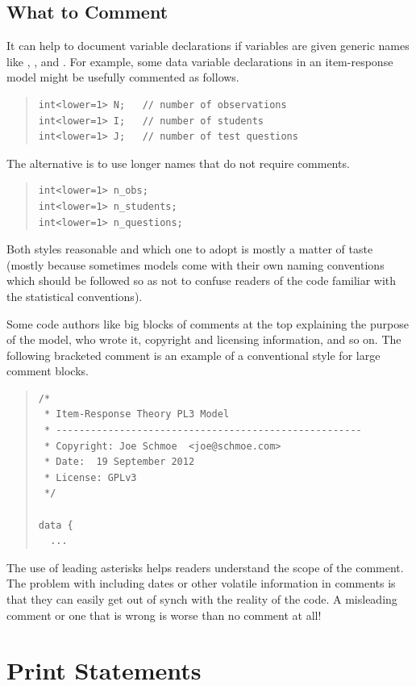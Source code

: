 \subsection{What to Comment}

It can help to document variable declarations if variables are given
generic names like , , and .  For
example, some data variable declarations in an item-response model
might be usefully commented as follows.
%
\begin{quote}
\begin{Verbatim}
int<lower=1> N;   // number of observations
int<lower=1> I;   // number of students
int<lower=1> J;   // number of test questions
\end{Verbatim}
\end{quote}
%
The alternative is to use longer names that do not require comments.
%
\begin{quote}
\begin{Verbatim}
int<lower=1> n_obs;
int<lower=1> n_students;
int<lower=1> n_questions;
\end{Verbatim}
\end{quote}
%
Both styles reasonable and which one to adopt is mostly a matter of
taste (mostly because sometimes models come with their own naming
conventions which should be followed so as not to confuse readers of
the code familiar with the statistical conventions).

Some code authors like big blocks of comments at the top explaining
the purpose of the model, who wrote it, copyright and licensing
information, and so on.  The following bracketed comment is an
example of a conventional style for large comment blocks.
%
\begin{quote}
\begin{Verbatim}
/*
 * Item-Response Theory PL3 Model
 * -----------------------------------------------------
 * Copyright: Joe Schmoe  <joe@schmoe.com>
 * Date:  19 September 2012
 * License: GPLv3
 */

data {
  ...
\end{Verbatim}
\end{quote}
%
The use of leading asterisks helps readers understand the scope of the
comment.  The problem with including dates or other volatile
information in comments is that they can easily get out of synch with
the reality of the code.  A misleading comment or one that is wrong is
worse than no comment at all!

\section{Print Statements}

